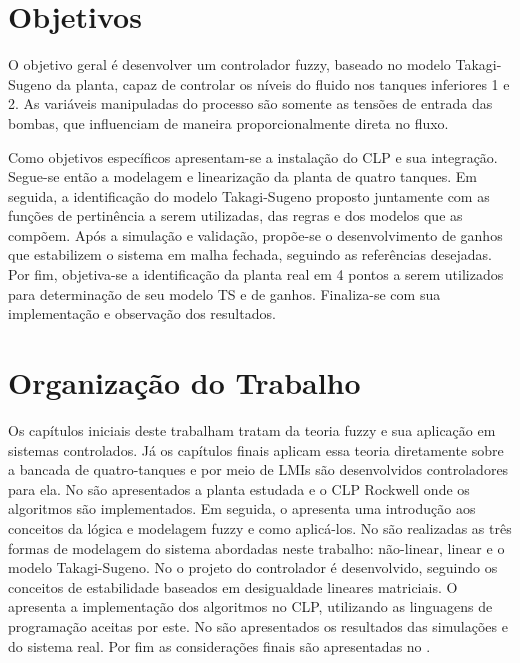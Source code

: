 \section{Objetivos}
O objetivo geral é desenvolver um controlador fuzzy, baseado no modelo Takagi-Sugeno da planta, capaz de controlar os níveis do fluido nos tanques inferiores 1 e 2. As variáveis manipuladas do processo são somente as tensões de entrada das bombas, que influenciam de maneira proporcionalmente direta no fluxo.

Como objetivos específicos apresentam-se a instalação do CLP e sua integração. Segue-se então a modelagem e linearização da planta de quatro tanques. Em seguida, a identificação do modelo Takagi-Sugeno proposto juntamente com as funções de pertinência a serem utilizadas, das regras e dos modelos que as compõem. Após a simulação e validação, propõe-se o desenvolvimento de ganhos que estabilizem o sistema em malha fechada, seguindo as referências desejadas. Por fim, objetiva-se a identificação da planta real em 4 pontos a serem utilizados para determinação de seu modelo TS e de ganhos. Finaliza-se com sua implementação e observação dos resultados.

\section{Organização do Trabalho}
Os capítulos iniciais deste trabalham tratam da teoria fuzzy e sua aplicação em sistemas controlados. Já os capítulos finais aplicam essa teoria diretamente sobre a bancada de quatro-tanques e por meio de LMIs são desenvolvidos controladores para ela. No  são apresentados a planta estudada e o CLP Rockwell onde os algoritmos são implementados. Em seguida, o  apresenta uma introdução aos conceitos da lógica e modelagem fuzzy e como aplicá-los. No  são realizadas as três formas de modelagem do sistema abordadas neste trabalho: não-linear, linear e o modelo Takagi-Sugeno. No  o projeto do controlador é desenvolvido, seguindo os conceitos de estabilidade baseados em desigualdade lineares matriciais. O  apresenta a implementação dos algoritmos no CLP, utilizando as linguagens de programação aceitas por este. No  são apresentados os resultados das simulações e do sistema real. Por fim as considerações finais são apresentadas no .


%


